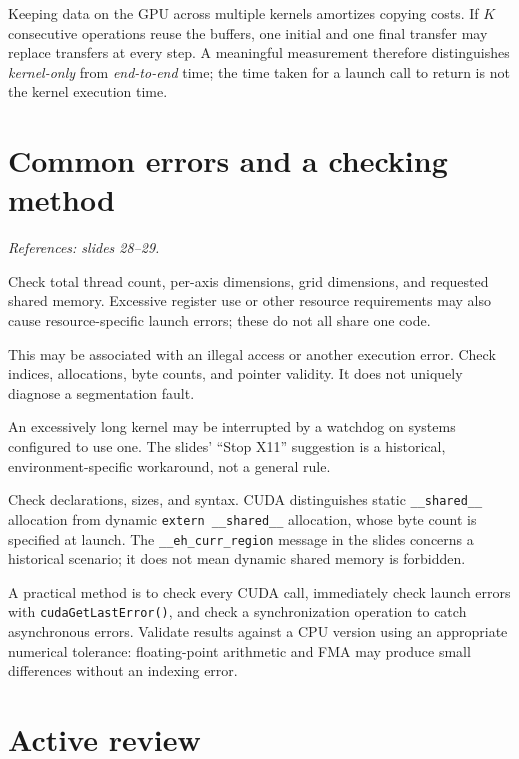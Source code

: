 \documentclass[11pt,a4paper]{article}
\let\originalsection\section
\renewcommand{\section}{\Needspace{7\baselineskip}\originalsection}
\newcommand{\src}[1]{\par{\small\color{accent}\textit{References: #1.}}\par}
\begin{document}
Keeping data on the GPU across multiple kernels amortizes copying costs.
If $K$ consecutive operations reuse the buffers, one initial and one final
transfer may replace transfers at every step. A meaningful measurement
therefore distinguishes \emph{kernel-only} from \emph{end-to-end} time;
the time taken for a launch call to return is not the kernel execution time.

\section{Common errors and a checking method}
\src{slides 28--29}
\begin{description}[style=nextline]
\item[\texttt{invalid configuration argument}]
Check total thread count, per-axis dimensions, grid dimensions, and requested
shared memory. Excessive register use or other resource requirements may
also cause resource-specific launch errors; these do not all share one code.
\item[\texttt{unspecified launch failure}]
This may be associated with an illegal access or another execution error.
Check indices, allocations, byte counts, and pointer validity. It does not
uniquely diagnose a segmentation fault.
\item[\texttt{the launch timed out and was terminated}]
An excessively long kernel may be interrupted by a watchdog on systems
configured to use one. The slides' ``Stop X11'' suggestion is a historical,
environment-specific workaround, not a general rule.
\item[Shared-memory compilation errors]
Check declarations, sizes, and syntax. CUDA distinguishes static
\texttt{\_\_shared\_\_} allocation from dynamic
\texttt{extern \_\_shared\_\_} allocation, whose byte count is specified
at launch. The \texttt{\_\_eh\_curr\_region} message in the slides concerns
a historical scenario; it does not mean dynamic shared memory is forbidden.
\end{description}

A practical method is to check every CUDA call, immediately check launch
errors with \texttt{cudaGetLastError()}, and check a synchronization
operation to catch asynchronous errors. Validate results against a CPU
version using an appropriate numerical tolerance: floating-point arithmetic
and FMA may produce small differences without an indexing error.

\section{Active review}
\end{document}
